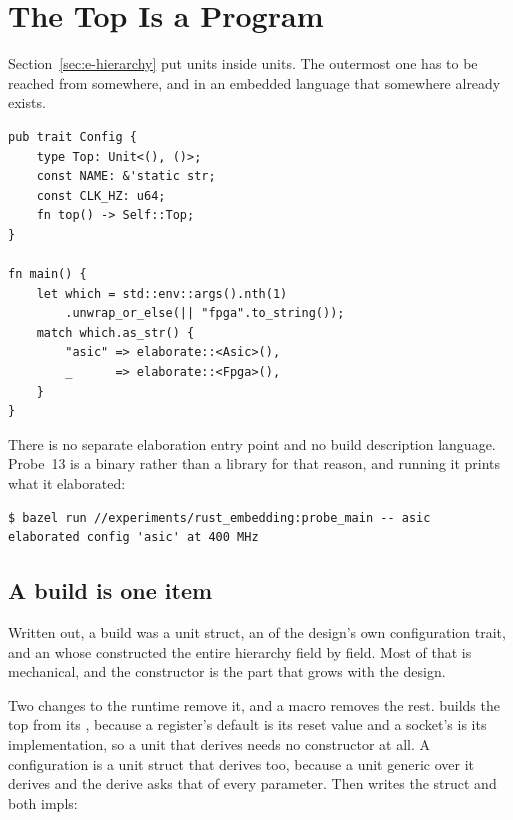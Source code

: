 \section{The Top Is a Program}
\label{sec:e-main}

Section~\ref{sec:e-hierarchy} put units inside units. The outermost one
has to be reached from somewhere, and in an embedded language that
somewhere already exists.

\begin{lstlisting}[caption={A design is a program. The config names the top unit as well as filling it, so \code{main} needs nothing else.},label={lst:main}]
pub trait Config {
    type Top: Unit<(), ()>;
    const NAME: &'static str;
    const CLK_HZ: u64;
    fn top() -> Self::Top;
}

fn main() {
    let which = std::env::args().nth(1)
        .unwrap_or_else(|| "fpga".to_string());
    match which.as_str() {
        "asic" => elaborate::<Asic>(),
        _      => elaborate::<Fpga>(),
    }
}
\end{lstlisting}

There is no separate elaboration entry point and no build description
language. Probe~13 is a binary rather than a library for that reason, and
running it prints what it elaborated:

\begin{lstlisting}[style=ascii,caption={Running the design. Each arm of the match is monomorphised separately, so both builds are compiled and either can be asked for.},label={lst:run}]
$ bazel run //experiments/rust_embedding:probe_main -- asic
elaborated config 'asic' at 400 MHz
\end{lstlisting}

\subsection{A build is one item}

Written out, a build was a unit struct, an  of the design's
own configuration trait, and an  whose 
constructed the entire hierarchy field by field. Most of that is
mechanical, and the constructor is the part that grows with the design.

Two changes to the runtime remove it, and a macro removes the rest.
 builds the top from its , because a
register's default is its reset value and a socket's is its
implementation, so a unit that derives  needs no
constructor at all. A configuration is a unit struct that derives
 too, because a unit generic over it derives
 and the derive asks that of every parameter. Then
 writes the struct and both impls:

